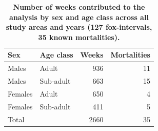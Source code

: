 \begin{table}[t]
\centering
\captionsetup{font=small}
\caption{\textbf{Number of weeks contributed to the analysis by sex and age
  class across all study areas and years (127 fox-intervals, 35 known
  mortalities).}}
\label{table:weeks}
\begin{tabular}{llrr}
\toprule
Sex     & Age class  & Weeks & Mortalities \\
\midrule
Males   & Adult      & 936   & 11 \\
Males   & Sub-adult  & 663   & 15 \\
Females & Adult      & 650   &  4 \\
Females & Sub-adult  & 411   &  5 \\
\midrule
Total   &            & 2660  & 35 \\
\bottomrule
\end{tabular}
\end{table}
